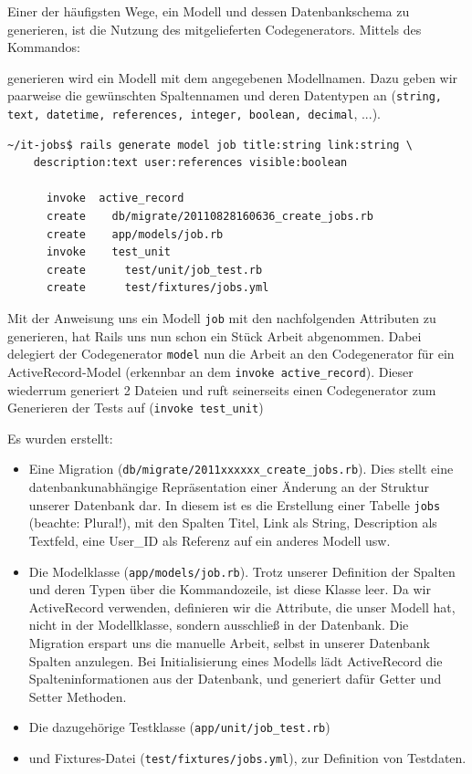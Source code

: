 Einer der häufigsten Wege, ein Modell und dessen Datenbankschema zu generieren, ist die Nutzung des mitgelieferten Codegenerators. Mittels des Kommandos:


generieren wird ein Modell mit dem angegebenen Modellnamen. Dazu geben wir paarweise die gewünschten Spaltennamen und deren Datentypen an (\texttt{string, text, datetime, references, integer, boolean, decimal}, ...).
\begin{lstlisting}
~/it-jobs$ rails generate model job title:string link:string \
    description:text user:references visible:boolean

      invoke  active_record
      create    db/migrate/20110828160636_create_jobs.rb
      create    app/models/job.rb
      invoke    test_unit
      create      test/unit/job_test.rb
      create      test/fixtures/jobs.yml

\end{lstlisting}
Mit der Anweisung uns ein Modell \texttt{job} mit den nachfolgenden Attributen zu generieren, hat Rails uns nun schon ein Stück Arbeit abgenommen. Dabei delegiert der Codegenerator \texttt{model} nun die Arbeit an den Codegenerator für ein ActiveRecord-Model (erkennbar an dem \texttt{invoke active\_record}). Dieser wiederrum generiert 2 Dateien und ruft seinerseits einen Codegenerator zum Generieren der Tests auf (\texttt{invoke test\_unit})

Es wurden erstellt:
\begin{itemize}
 \item Eine Migration (\verb|db/migrate/2011xxxxxx_create_jobs.rb|). Dies stellt eine datenbankunabhängige Repräsentation einer Änderung an der Struktur unserer Datenbank dar. In diesem ist es die Erstellung einer Tabelle \texttt{jobs} (beachte: Plural!), mit den Spalten Titel, Link als String, Description als Textfeld, eine User\_ID als Referenz auf ein anderes Modell usw.
 \item Die Modelklasse (\verb|app/models/job.rb|). Trotz unserer Definition der Spalten und deren Typen über die Kommandozeile, ist diese Klasse leer. Da wir ActiveRecord verwenden, definieren wir die Attribute, die unser Modell hat, nicht in der Modellklasse, sondern ausschließ in der Datenbank. Die Migration erspart uns die manuelle Arbeit, selbst in unserer Datenbank Spalten anzulegen. Bei Initialisierung eines Modells lädt ActiveRecord die Spalteninformationen aus der Datenbank, und generiert dafür Getter und Setter Methoden. 
 \item Die dazugehörige Testklasse (\verb|app/unit/job_test.rb|)
 \item und Fixtures-Datei (\verb|test/fixtures/jobs.yml|), zur Definition von Testdaten. 
\end{itemize}

